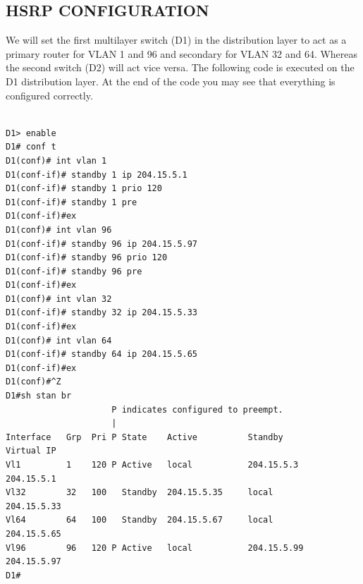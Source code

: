 \documentclass[ a4, 12pt, onecolumn]{IEEEtran}
\begin{document}
\subsection{HSRP CONFIGURATION}
We will set the first multilayer switch (D1) in the distribution layer to act as a primary router for VLAN 1 and 96 and secondary for VLAN 32 and 64. Whereas the second switch (D2) will act vice versa.
The following code is executed on the D1 distribution layer. At the end of the code you may see that everything is configured correctly.
\begin{center}
\begin{lstlisting}

D1> enable
D1# conf t
D1(conf)# int vlan 1
D1(conf-if)# standby 1 ip 204.15.5.1
D1(conf-if)# standby 1 prio 120
D1(conf-if)# standby 1 pre
D1(conf-if)#ex
D1(conf)# int vlan 96
D1(conf-if)# standby 96 ip 204.15.5.97
D1(conf-if)# standby 96 prio 120
D1(conf-if)# standby 96 pre
D1(conf-if)#ex
D1(conf)# int vlan 32
D1(conf-if)# standby 32 ip 204.15.5.33
D1(conf-if)#ex
D1(conf)# int vlan 64
D1(conf-if)# standby 64 ip 204.15.5.65
D1(conf-if)#ex
D1(conf)#^Z
D1#sh stan br
                     P indicates configured to preempt.
                     |
Interface   Grp  Pri P State    Active          Standby         Virtual IP
Vl1         1    120 P Active   local           204.15.5.3      204.15.5.1     
Vl32        32   100   Standby  204.15.5.35     local           204.15.5.33    
Vl64        64   100   Standby  204.15.5.67     local           204.15.5.65    
Vl96        96   120 P Active   local           204.15.5.99     204.15.5.97    
D1#

\end{lstlisting}
\end{center}
\end{document}
